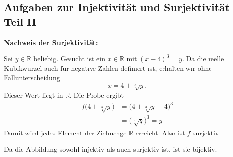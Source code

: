 \subsection{Aufgaben zur Injektivität und Surjektivität Teil II}

\textbf{Nachweis der Surjektivität:}

Sei $y\in\mathbb{R}$ beliebig. Gesucht ist ein
$x\in\mathbb{R}$ mit $(x-4)^3=y$.
Da die reelle Kubikwurzel auch für negative Zahlen
definiert ist, erhalten wir ohne Fallunterscheidung
\[
x=4+\sqrt[3]{y}.
\]
Dieser Wert liegt in $\mathbb{R}$. Die Probe ergibt
\begin{align*}
f\bigl(4+\sqrt[3]{y}\bigr)
&=\bigl(4+\sqrt[3]{y}-4\bigr)^3\\
&=\bigl(\sqrt[3]{y}\bigr)^3=y.
\end{align*}
Damit wird jedes Element der Zielmenge $\mathbb{R}$
erreicht. Also ist $f$ surjektiv.

Da die Abbildung sowohl injektiv als auch surjektiv
ist, ist sie bijektiv.
